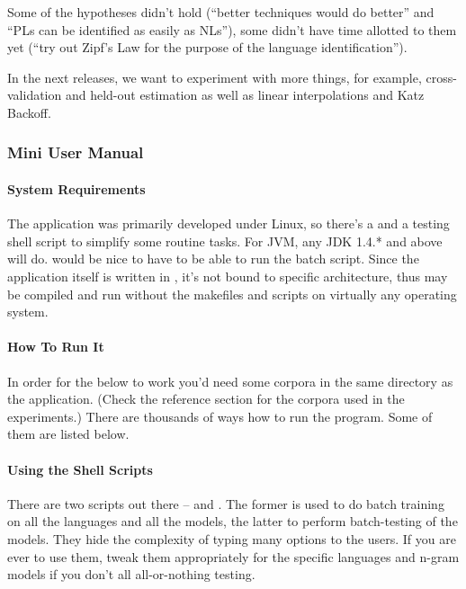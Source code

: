 Some of the hypotheses didn't hold (``better techniques would do better'' and
``PLs can be identified as easily as NLs''),
some didn't have time allotted to them yet (``try out Zipf's Law for the purpose
of the language identification'').

In the next releases, we want to experiment with more things, for example,
cross-validation and held-out estimation as well as
linear interpolations and Katz Backoff.


\subsubsection{Mini User Manual}
\label{sect:lang-ident-app-manual}

\paragraph{System Requirements}

The application was primarily developed under Linux, so there's
a  and a testing shell script to simplify some routine tasks.
For JVM, any JDK 1.4.* and above will do.  would be nice
to have to be able to run the batch script. Since the application
itself is written in {\java}, it's not bound to specific architecture,
thus may be compiled and run without the makefiles and scripts
on virtually any operating system.

\paragraph{How To Run It}

In order for the below to work you'd need some corpora in
the same directory as the application. (Check the reference
section for the corpora used in the experiments.)
There are thousands of ways how to run the program. Some of them are listed below.

\paragraph{Using the Shell Scripts}

There are two scripts out there --  and .
The former is used to do batch training on all the languages and all the models,
the latter to perform batch-testing of the models. They hide the complexity
of typing many options to the users. If you are ever to use them, tweak
them appropriately for the specific languages and n-gram models if you don't
all all-or-nothing testing.

